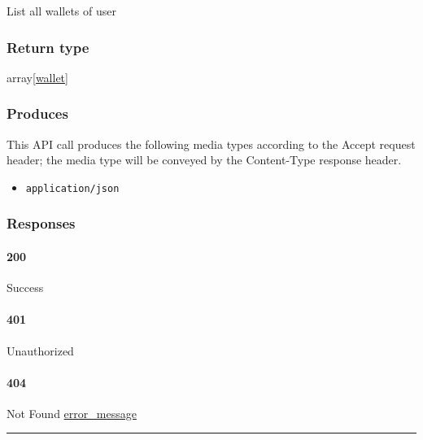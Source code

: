 List all wallets of user

\hypertarget{return-type-139}{%
\subsubsection{Return type}\label{return-type-139}}

array{[}\protect\hyperlink{wallet}{wallet}{]}

\hypertarget{produces-177}{%
\subsubsection{Produces}\label{produces-177}}

This API call produces the following media types according to the
{Accept} request header; the media type will be conveyed by the
{Content-Type} response header.

\begin{itemize}
\tightlist
\item
  \texttt{application/json}
\end{itemize}

\hypertarget{responses-183}{%
\subsubsection{Responses}\label{responses-183}}

\hypertarget{section-589}{%
\paragraph{200}\label{section-589}}

Success

\hypertarget{section-590}{%
\paragraph{401}\label{section-590}}

Unauthorized \protect\hyperlink{}{}

\hypertarget{section-591}{%
\paragraph{404}\label{section-591}}

Not Found \protect\hyperlink{error_message}{error\_message}

\begin{center}\rule{0.5\linewidth}{\linethickness}\end{center}

